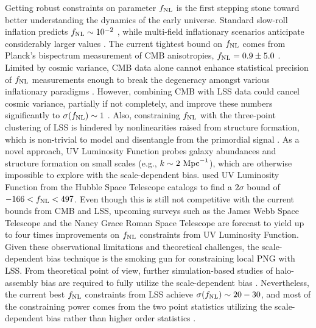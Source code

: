 Getting robust constraints on parameter $f_{\rm NL}$ is the first stepping stone toward better understanding the dynamics of the early universe. Standard slow-roll inflation predicts $f_{\rm NL} \sim 10^{-2}$ \citep[see, e.g.,][for a review]{alvarez2014arXiv1412.4671A}, while multi-field inflationary scenarios anticipate considerably larger values \citep[see, e.g.,][]{de2017next}. The current tightest bound on $f_{\rm NL}$ comes from Planck's bispectrum measurement of CMB anisotropies, $f_{\rm NL}=0.9\pm 5.0$ \citep{akrami2019planck}. Limited by cosmic variance, CMB data alone cannot enhance statistical precision of $f_{\rm NL}$ measurements enough to break the degeneracy amongst various inflationary paradigms \citep[see, e.g.,][]{ade2019simons}. However, combining CMB with LSS data could cancel cosmic variance, partially if not completely, and improve these numbers significantly to $\sigma(f_{\rm NL}) \sim 1$ \citep[see, e.g.,][]{schmittfull2018PhRvD}. Also, constraining $f_{\rm NL}$ with the three-point clustering of LSS is hindered by nonlinearities raised from structure formation, which is non-trivial to model and disentangle from the primordial signal \citep{baldauf2011galaxy, baldauf2011primordial}. As a novel approach, UV Luminosity Function probes galaxy abundances and structure formation on small scales (e.g., $k \sim 2~{\rm Mpc}^{-1}$), which are otherwise impossible to explore with the scale-dependent bias. \cite{sabti2021JCAP} used UV Luminosity Function from the Hubble Space Telescope catalogs \citep{bouwens2015ApJ} to find a $2\sigma$ bound of $-166<f_{\rm NL}<497$. Even though this is still not competitive with the current bounds from CMB and LSS, upcoming surveys such as the James Webb Space Telescope and the Nancy Grace Roman Space Telescope are forecast to yield up to four times improvements on $
f_{\rm NL}$ constraints from UV Luminosity Function. Given these observational limitations and theoretical challenges, the scale-dependent bias technique is the smoking gun for constraining local PNG with LSS. From theoretical point of view, further simulation-based studies of halo-assembly bias are required to fully utilize the scale-dependent bias \citep{2020JCAP...12..013B, 2020JCAP...12..031B, 2022JCAP...11..013B, 2023JCAP...01..023L}. Nevertheless, the current best $f_{\rm NL}$ constraints from LSS achieve $\sigma(f_{\rm NL}) \sim 20-30$, and most of the constraining power comes from the two point statistics utilizing the scale-dependent bias rather than higher order statistics \citep{2019JCAP...09..010C, mueller2022primordial, 2022PhRvD.106d3506C, 2022arXiv220111518D}.

